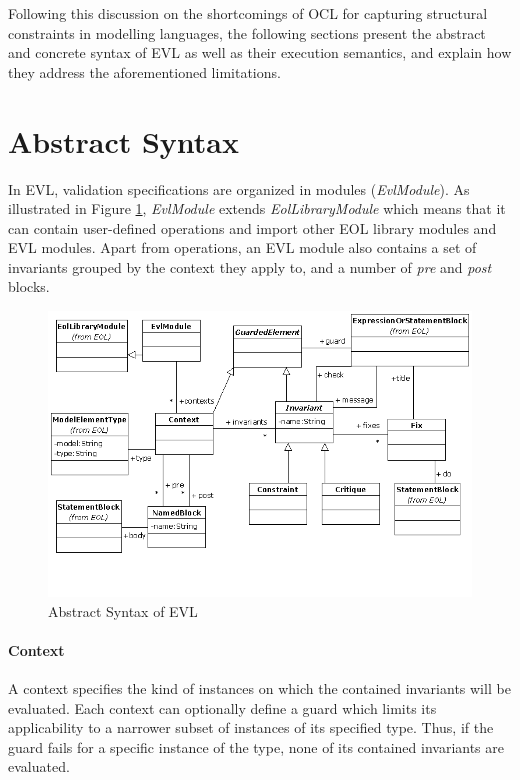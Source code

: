 \noindent Following this discussion on the shortcomings of OCL for capturing structural constraints in modelling languages, the following sections present the abstract and concrete syntax of EVL as well as their execution semantics, and explain how they address the aforementioned limitations.

\section{Abstract Syntax}

In EVL, validation specifications are organized in modules (\emph{EvlModule}). As illustrated in Figure \ref{fig:EvlAbstractSyntax}, \emph{EvlModule} extends \emph{EolLibraryModule} which means that it can contain user-defined operations and import other EOL library modules and EVL modules. Apart from operations, an EVL module also contains a set of invariants grouped by the context they apply to, and a number of \emph{pre} and \emph{post} blocks.

\begin{figure}
	\centering
	\includegraphics{images/EvlAbstractSyntax.png}
	\caption{Abstract Syntax of EVL}
	\label{fig:EvlAbstractSyntax}
\end{figure}

\paragraph{Context} A context specifies the kind of instances on which the contained invariants will be evaluated. Each context can optionally define a guard which limits its applicability to a narrower subset of instances of its specified type. Thus, if the guard fails for a specific instance of the type, none of its contained invariants are evaluated.

